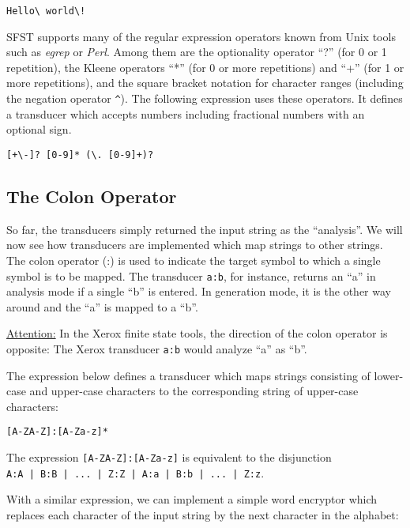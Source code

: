 \documentclass[11pt]{article}
\begin{document}
\begin{verbatim}
Hello\ world\!
\end{verbatim}

SFST supports many of the regular expression operators known from Unix
tools such as \emph{egrep} or \emph{Perl}. Among them are the
optionality operator ``?'' (for 0 or 1 repetition), the Kleene
operators ``*'' (for 0 or more repetitions) and ``+'' (for 1 or more
repetitions), and the square bracket notation for character ranges
(including the negation operator \verb#^#).
The following expression uses these operators. It defines a transducer
which accepts numbers including fractional numbers with an optional
sign.

\begin{verbatim}
[+\-]? [0-9]* (\. [0-9]+)?
\end{verbatim}


\subsection{The Colon Operator}

So far, the transducers simply returned the input string as the
``analysis''. We will now see how transducers are implemented which
map strings to other strings. The colon operator (:) is used to
indicate the target symbol to which a single symbol is to be
mapped. The transducer \verb#a:b#, for instance, returns an ``a'' in
analysis mode if a single ``b'' is entered. In generation mode, it is
the other way around and the ``a'' is mapped to a ``b''.

\underline{Attention:} In the Xerox finite state tools, the direction
of the colon operator is opposite: The Xerox transducer \verb#a:b#
would analyze ``a'' as ``b''.

The expression below defines a transducer which maps strings
consisting of lower-case and upper-case characters to the
corresponding string of upper-case characters:

\begin{verbatim}
[A-ZA-Z]:[A-Za-z]*
\end{verbatim}

The expression \verb#[A-ZA-Z]:[A-Za-z]# is equivalent to the
disjunction\\ \verb#A:A | B:B | ... | Z:Z | A:a | B:b | ... | Z:z#.

With a similar expression, we can implement a simple word encryptor
which replaces each character of the input string by the next
character in the alphabet:
\end{document}
